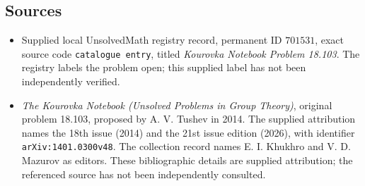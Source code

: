 \documentclass[11pt]{article}
\begin{document}
\subsection{Sources}
\begin{itemize}
\item Supplied local UnsolvedMath registry record, permanent ID \(701531\), exact source code \texttt{catalogue entry}, titled \emph{Kourovka Notebook Problem 18.103}. The registry labels the problem open; this supplied label has not been independently verified.
\item \emph{The Kourovka Notebook (Unsolved Problems in Group Theory)}, original problem 18.103, proposed by A. V. Tushev in 2014. The supplied attribution names the 18th issue (2014) and the 21st issue edition (2026), with identifier \texttt{arXiv:1401.0300v48}. The collection record names E. I. Khukhro and V. D. Mazurov as editors. These bibliographic details are supplied attribution; the referenced source has not been independently consulted.
\end{itemize}
\end{document}
